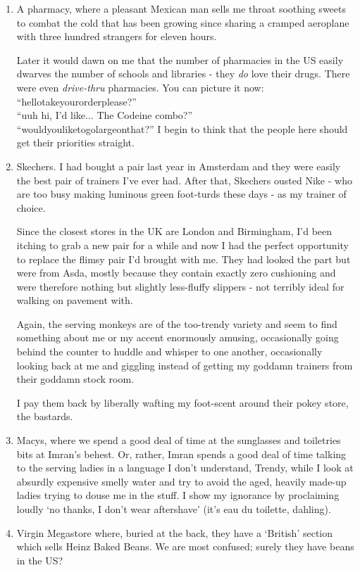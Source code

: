 \documentclass[a5paper,titlepage,11pt]{book}
\begin{document}
\begin{enumerate}
\item A pharmacy, where a pleasant Mexican man sells me throat soothing sweets to combat the cold that has been growing since sharing a cramped aeroplane with three hundred strangers for eleven hours.

Later it would dawn on me that the number of pharmacies in the US easily dwarves the number of schools and libraries - they \emph{do} love their drugs.  There were even \emph{drive-thru} pharmacies.  You can picture it now: \\ ``hellotakeyourorderplease?'' \\ ``uuh hi, I'd like... The Codeine combo?'' \\ ``wouldyouliketogolargeonthat?''  I begin to think that the people here should get their priorities straight.

\item Skechers.  I had bought a pair last year in Amsterdam and they were easily the best pair of trainers I've ever had.  After that, Skechers ousted Nike - who are too busy making luminous green foot-turds these days - as my trainer of choice.

Since the closest stores in the UK are London and Birmingham, I'd been itching to grab a new pair for a while and now I had the perfect opportunity to replace the flimsy pair I'd brought with me.  They had looked the part but were  from Asda, mostly because they contain exactly zero cushioning and were therefore nothing but slightly less-fluffy slippers - not terribly ideal for walking on pavement with.

Again, the serving monkeys are of the too-trendy variety and seem to find something about me or my accent enormously amusing, occasionally going behind the counter to huddle and whisper to one another, occasionally looking back at me and giggling instead of getting my goddamn trainers from their goddamn stock room.

I pay them back by liberally wafting my foot-scent around their pokey store, the bastards.

\item Macys, where we spend a good deal of time at the sunglasses and toiletries bits at Imran's behest.  Or, rather, Imran spends a good deal of time talking to the serving ladies in a language I don't understand, Trendy, while I look at absurdly expensive smelly water and try to avoid the aged, heavily made-up ladies trying to douse me in the stuff. I show my ignorance by proclaiming loudly `no thanks, I don't wear aftershave' (it's eau du toilette, dahling).

\item Virgin Megastore where, buried at the back, they have a `British' section which sells Heinz Baked Beans.  We are most confused; surely they have beans in the US?
\end{enumerate}
\end{document}
